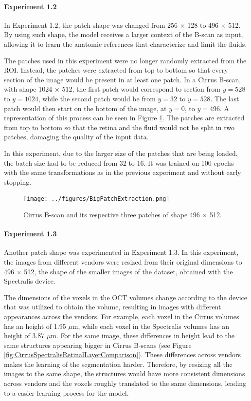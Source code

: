 \paragraph{Experiment 1.2}
In Experiment 1.2, the patch shape was changed from 256 $\times$ 128 to 496 $\times$ 512. By using such shape, the model receives a larger context of the B-scan as input, allowing it to learn the anatomic references that characterize and limit the fluids.
\par
The patches used in this experiment were no longer randomly extracted from the ROI. Instead, the patches were extracted from top to bottom so that every section of the image would be present in at least one patch. In a Cirrus B-scan, with shape 1024 $\times$ 512, the first patch would correspond to section from $y=528$ to $y=1024$, while the second patch would be from $y=32$ to $y=528$. The last patch would then start on the bottom of the image, at $y=0$, to $y=496$. A representation of this process can be seen in Figure \ref{fig:BigPatchExtraction}. The patches are extracted from top to bottom so that the retina and the fluid would not be split in two patches, damaging the quality of the input data.
\par
In this experiment, due to the larger size of the patches that are being loaded, the batch size had to be reduced from 32 to 16. It was trained on 100 epochs with the same transformations as in the previous experiment and without early stopping.

\begin{figure}[!ht]
	\centering
	\texttt{[image: ../figures/BigPatchExtraction.png]}
	\caption{Cirrus B-scan and its respective three patches of shape 496 $\times$ 512.}
	\label{fig:BigPatchExtraction}
\end{figure}

\paragraph{Experiment 1.3}
Another patch shape was experimented in Experiment 1.3. In this experiment, the images from different vendors were resized from their original dimensions to 496 $\times$ 512, the shape of the smaller images of the dataset, obtained with the Spectralis device. 
\par
The dimensions of the voxels in the OCT volumes change according to the device that was utilized to obtain the volume, resulting in images with different appearances across the vendors. For example, each voxel in the Cirrus volumes has an height of 1.95 $\mu$m, while each voxel in the Spectralis volumes has an height of 3.87 $\mu$m. For the same image, these differences in height lead to the same structures appearing bigger in Cirrus B-scans (see Figure \ref{fig:CirrusSpectralisRetinalLayerComparison}). These differences across vendors makes the learning of the segmentation harder. Therefore, by resizing all the images to the same shape, the structures would have more consistent dimensions across vendors and the voxels roughly translated to the same dimensions, leading to a easier learning process for the model.

